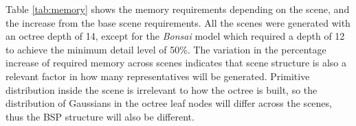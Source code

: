 Table \ref{tab:memory} shows the memory requirements depending on the scene, and the increase from the base scene requirements. All the scenes were generated with an octree depth of 14, except for the \textit{Bonsai} model which required a depth of 12 to achieve the minimum detail level of 50\%. The variation in the percentage increase of required memory across scenes indicates that scene structure is also a relevant factor in how many representatives will be generated. Primitive distribution inside the scene is irrelevant to how the octree is built, so the distribution of Gaussians in the octree leaf nodes will differ across the scenes, thus the BSP structure will also be different.